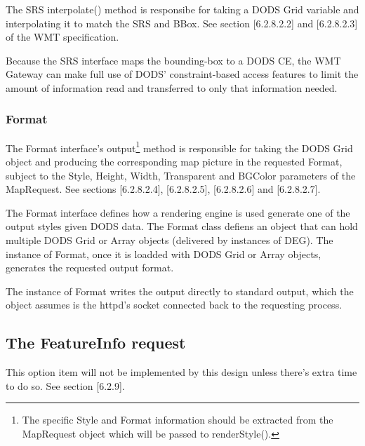 \documentclass{article}
\begin{document}
The SRS interpolate() method is responsibe for taking a DODS Grid variable
and interpolating it to match the SRS and BBox. See section [6.2.8.2.2] and
[6.2.8.2.3] of the WMT specification.

Because the SRS interface maps the bounding-box to a DODS CE, the WMT Gateway
can make full use of DODS' constraint-based access features to limit the
amount of information read and transferred to only that information needed.

\subsubsection{Format}

The Format interface's output\footnote{The specific Style and Format
  information should be extracted from the MapRequest object which will be
  passed to renderStyle().} method is responsible for taking the DODS Grid
object and producing the corresponding map picture in the requested Format,
subject to the Style, Height, Width, Transparent and BGColor parameters of
the MapRequest.  See sections [6.2.8.2.4], [6.2.8.2.5], [6.2.8.2.6] and
[6.2.8.2.7].

The Format interface defines how a rendering engine is used generate one of
the output styles given DODS data. The Format class defiens an object that
can hold multiple DODS Grid or Array objects (delivered by instances of DEG).
The instance of Format, once it is loadded with DODS Grid or Array objects,
generates the requested output format. 

The instance of Format writes the output directly to standard output, which
the object assumes is the httpd's socket connected back to the requesting
process. 

\subsection{The FeatureInfo request}
This option item will not be implemented by this design unless there's extra
time to do so. See section [6.2.9].

\clearpage
\appendix
\end{document}
